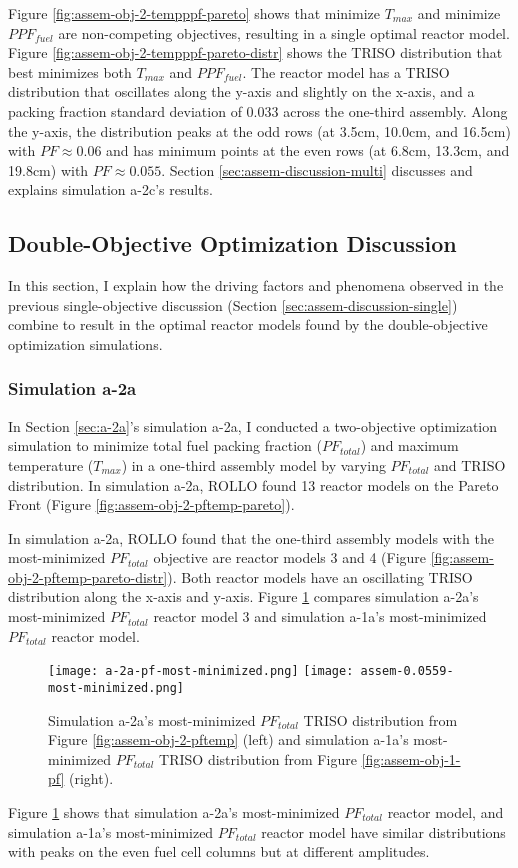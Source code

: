 Figure \ref{fig:assem-obj-2-tempppf-pareto} shows that minimize $T_{max}$ and minimize 
$PPF_{fuel}$ are non-competing objectives, resulting in a single optimal reactor 
model. 
Figure \ref{fig:assem-obj-2-tempppf-pareto-distr} shows the TRISO distribution that best 
minimizes both $T_{max}$ and $PPF_{fuel}$. 
The reactor model has a TRISO distribution that oscillates along the y-axis and 
slightly on the x-axis, and a packing fraction standard deviation of $0.033$ 
across the one-third assembly. 
Along the y-axis, the distribution peaks at the odd rows (at 3.5cm, 10.0cm, and 16.5cm) 
with $PF\approx0.06$ and has minimum points at the even rows (at 6.8cm, 13.3cm, and 
19.8cm) with $PF\approx0.055$.
Section \ref{sec:assem-discussion-multi} discusses and explains simulation a-2c's 
results.

\subsection{Double-Objective Optimization Discussion}
\label{sec:assem-discussion-two}
In this section, I explain how the driving factors and phenomena observed in 
the previous single-objective discussion (Section \ref{sec:assem-discussion-single}) 
combine to result in the optimal reactor models found by the double-objective 
optimization simulations. 

\subsubsection{Simulation a-2a}
In Section \ref{sec:a-2a}'s simulation a-2a, I conducted a two-objective 
optimization simulation to minimize total fuel packing fraction ($PF_{total}$) and 
maximum temperature ($T_{max}$) in a one-third assembly model by varying $PF_{total}$ 
and TRISO distribution. 
In simulation a-2a, ROLLO found 13 reactor models on the Pareto Front (Figure 
\ref{fig:assem-obj-2-pftemp-pareto}). 

In simulation a-2a, \gls{ROLLO} found that the one-third assembly models with the 
most-minimized $PF_{total}$ objective are reactor models 3 and 4 (Figure 
\ref{fig:assem-obj-2-pftemp-pareto-distr}). 
Both reactor models have an oscillating TRISO distribution along the x-axis 
and y-axis. 
Figure \ref{fig:a-2a-pf-triso-comparison} compares simulation a-2a's most-minimized 
$PF_{total}$ reactor model 3 and simulation a-1a's most-minimized $PF_{total}$ reactor 
model. 
\begin{figure}[htbp!]
    \centering
    \texttt{[image: a-2a-pf-most-minimized.png]} 
    \texttt{[image: assem-0.0559-most-minimized.png]} 
    \caption{Simulation a-2a's most-minimized $PF_{total}$ TRISO distribution 
    from Figure \ref{fig:assem-obj-2-pftemp} (left) and simulation a-1a's 
    most-minimized $PF_{total}$ TRISO distribution from Figure 
    \ref{fig:assem-obj-1-pf} (right).}
    \label{fig:a-2a-pf-triso-comparison}
\end{figure}
Figure \ref{fig:a-2a-pf-triso-comparison} shows that simulation a-2a's most-minimized 
$PF_{total}$ reactor model, and simulation a-1a's most-minimized $PF_{total}$ reactor 
model have similar distributions with peaks on the even fuel cell columns but at 
different amplitudes. 


